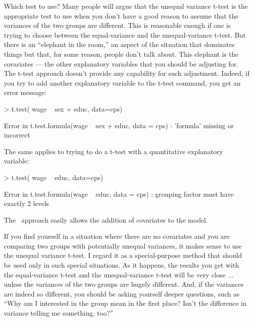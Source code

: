 Which test to use?  Many people will argue that the unequal variance
t-test is the appropriate test to use when you don't have a good
reason to assume that the variances of the two groups are different.
This is reasonable enough if one is trying to choose between the
equal-variance and the unequal-variance t-test.  But there is an
``elephant in the room,'' an aspect of the situation that dominates
things but that, for some reason, people don't talk about.  This
elephant is the covariates --- the other explanatory variables 
that you should be adjusting for.  The t-test approach doesn't provide
any capability for such adjustment.  Indeed, if you try to add another
explanatory variable to the t-test command, you get an error message:
\begin{Schunk}
\begin{Sinput}
> t.test( wage ~ sex + educ, data=cps)
\end{Sinput}
\end{Schunk}
\begin{Schunk}
\begin{Soutput}
Error in t.test.formula(wage ~ sex + educ, data = cps) : 
  'formula' missing or incorrect
\end{Soutput}
\end{Schunk}
The same applies to trying to do a t-test with a quantitative
explanatory variable:
\begin{Schunk}
\begin{Sinput}
> t.test( wage ~ educ, data=cps)
\end{Sinput}
\end{Schunk}
\begin{Schunk}
\begin{Soutput}
Error in t.test.formula(wage ~ educ, data = cps) : 
  grouping factor must have exactly 2 levels
\end{Soutput}
\end{Schunk}


The \ANOVA\ approach easily allows the addition of covariates to the
model.  

If you find yourself in a situation where there are no covariates and
you are comparing two groups with potentially unequal variances, it
makes sense to use the unequal variance t-test.  I regard it as a
special-purpose method that should be used only in such special
situations.  As it happens, the results you get with the
equal-variance t-test and the unequal-variance t-test will be very
close ... unless the variances of the two groups are hugely different.
And, if the variances are indeed so different, you should be asking
yourself deeper questions, such as ``Why am I interested in the group
mean in the first place?  Isn't the difference in variance telling me
something, too?''


